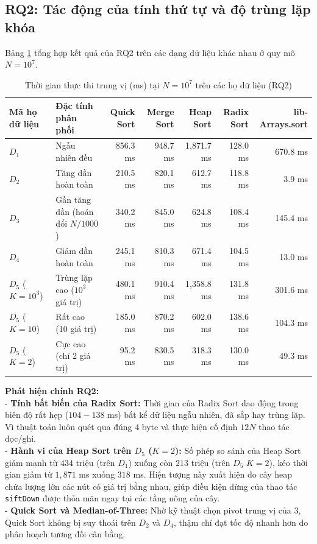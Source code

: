 \documentclass[conference]{IEEEtran}
\begin{document}
\subsection{RQ2: Tác động của tính thứ tự và độ trùng lặp khóa}
Bảng \ref{tab:rq2} tổng hợp kết quả của RQ2 trên các dạng dữ liệu khác nhau ở quy mô $N = 10^7$.

\begin{table}[t]
\caption{Thời gian thực thi trung vị (ms) tại $N = 10^7$ trên các họ dữ liệu (RQ2)}
\label{tab:rq2}
\centering
\small
\begin{tabular*}{\textwidth}{@{\extracolsep{\fill}}llrrrrr@{}}
\toprule
\textbf{Mã họ dữ liệu} & \textbf{Đặc tính phân phối} & \textbf{Quick Sort} & \textbf{Merge Sort} & \textbf{Heap Sort} & \textbf{Radix Sort} & \textbf{lib-Arrays.sort} \\
\midrule
$D_1$ & Ngẫu nhiên đều & 856.3 ms & 948.7 ms & 1,871.7 ms & 128.0 ms & 670.8 ms \\
$D_2$ & Tăng dần hoàn toàn & 210.5 ms & 820.1 ms & 612.7 ms & 118.8 ms & 3.9 ms \\
$D_3$ & Gần tăng dần (hoán đổi $N/1000$) & 340.2 ms & 845.0 ms & 624.8 ms & 108.4 ms & 145.4 ms \\
$D_4$ & Giảm dần hoàn toàn & 245.1 ms & 810.3 ms & 671.4 ms & 104.5 ms & 13.0 ms \\
$D_5$ ($K=10^3$) & Trùng lặp cao ($10^3$ giá trị) & 480.1 ms & 910.4 ms & 1,358.8 ms & 131.8 ms & 301.6 ms \\
$D_5$ ($K=10$)   & Rất cao (10 giá trị) & 185.0 ms & 870.2 ms & 602.0 ms & 138.6 ms & 104.3 ms \\
$D_5$ ($K=2$)    & Cực cao (chỉ 2 giá trị) & 95.2 ms & 830.5 ms & 318.3 ms & 130.0 ms & 49.3 ms \\
\bottomrule
\end{tabular*}
\end{table}

\textbf{Phát hiện chính RQ2:}\\
- \textbf{Tính bất biến của Radix Sort:} Thời gian của Radix Sort dao động trong biên độ rất hẹp ($104 - 138$ ms) bất kể dữ liệu ngẫu nhiên, đã sắp hay trùng lặp. Vì thuật toán luôn quét qua đúng 4 byte và thực hiện cố định $12N$ thao tác đọc/ghi.\\
- \textbf{Hành vi của Heap Sort trên $D_5$ ($K=2$):} Số phép so sánh của Heap Sort giảm mạnh từ $434$ triệu (trên $D_1$) xuống còn $213$ triệu (trên $D_5$ $K=2$), kéo thời gian giảm từ $1,871$ ms xuống $318$ ms. Hiện tượng này xuất hiện do cây heap chứa lượng lớn các nút có giá trị bằng nhau, giúp điều kiện dừng của thao tác \texttt{siftDown} được thỏa mãn ngay tại các tầng nông của cây.\\
- \textbf{Quick Sort và Median-of-Three:} Nhờ kỹ thuật chọn pivot trung vị của 3, Quick Sort không bị suy thoái trên $D_2$ và $D_4$, thậm chí đạt tốc độ nhanh hơn do phân hoạch tương đối cân bằng.
\end{document}
